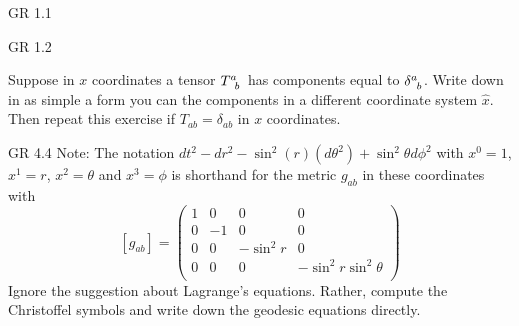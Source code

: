 \documentclass[minion]{homework}
\begin{document}
\begin{aproblems}
\hproblem GR 1.1

\hproblem GR 1.2

\hproblem Suppose in $x$ coordinates a tensor $\tensor{T}{^a_b}$
has components equal to $\tensor{\delta}{^a_b}$.   Write down
in as simple a form you can the components in a different coordinate
system $\hat x$.  Then repeat this exercise if $T_{ab}=\delta_{ab}$
in $x$ coordinates.

\hproblem GR 4.4
Note: The notation $dt^2-dr^2-\sin^2(r)(d\theta^2)+\sin^2\theta d\phi^2$
with $x^0=1$, $x^1=r$, $x^2=\theta$ and $x^3=\phi$ is shorthand
for the metric $g_{ab}$ in these coordinates with
\[
[g_{ab}] = \begin{pmatrix} 
1 & 0 & 0 & 0 \\
0 & -1 & 0 & 0 \\
0 &  0 & -\sin^2r & 0 \\
0 & 0 & 0 & -\sin^2 r \sin^2 \theta \\
\end{pmatrix}
\]
Ignore the suggestion about Lagrange's equations.  Rather, compute the Christoffel symbols
and write down the geodesic equations directly.  

\end{aproblems}
\end{document}
